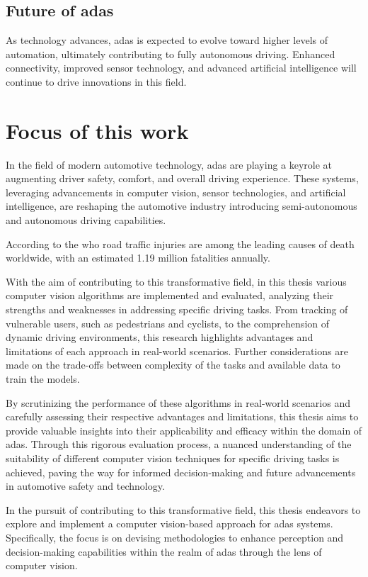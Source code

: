 \subsection*{Future of \ac{adas}}
As technology advances, \ac{adas} is expected to evolve toward higher levels of automation, ultimately contributing to fully autonomous driving. Enhanced connectivity, improved sensor technology, and advanced artificial intelligence will continue to drive innovations in this field.
%
\section{Focus of this work}
%
In the field of modern automotive technology, \ac{adas} are playing a keyrole at augmenting driver safety, comfort, and overall driving experience.
These systems, leveraging advancements in computer vision, sensor technologies, and artificial intelligence, are reshaping the automotive industry introducing semi-autonomous and autonomous driving capabilities.

According to the \ac{who} road traffic injuries are among the leading causes of death worldwide, with an estimated 1.19 million fatalities annually.

\cite{key}
With the aim of contributing to this transformative field, in this thesis various computer vision algorithms are implemented and evaluated, analyzing their strengths and weaknesses in addressing specific driving tasks.
From tracking of vulnerable users, such as pedestrians and cyclists, to the comprehension of dynamic driving environments, this research highlights advantages and limitations of each approach in real-world scenarios.
Further considerations are made on the trade-offs between complexity of the tasks and available data to train the models. 

By scrutinizing the performance of these algorithms in real-world scenarios and carefully assessing their respective advantages and limitations, this thesis aims to provide valuable insights into their applicability and efficacy within the domain of \ac{adas}. 
Through this rigorous evaluation process, a nuanced understanding of the suitability of different computer vision techniques for specific driving tasks is achieved, paving the way for informed decision-making and future advancements in automotive safety and technology.

In the pursuit of contributing to this transformative field, this thesis endeavors to explore and implement a computer vision-based approach for \ac{adas} systems. 
Specifically, the focus is on devising methodologies to enhance perception and decision-making capabilities within the realm of \ac{adas} through the lens of computer vision.


